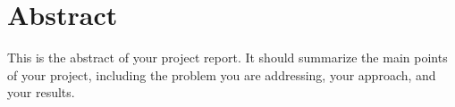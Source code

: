 \doublespacing
\newpage
\section*{Abstract}
This is the abstract of your project report. It should summarize the main points 
of your project, including the problem you are addressing, your approach, and your results.
